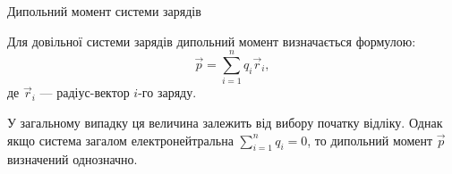\documentclass{beamer}
\begin{document}
\begin{frame}{Дипольний момент системи зарядів}{}
  	\begin{block}{}\justifying
		Для довільної системи зарядів дипольний момент визначається формулою:
		\begin{equation*}
			\vec{p} = \sum_{i=1}^{n}q_i\vec{r}_i,
		\end{equation*}
		де $\vec{r}_i$ --- радіус-вектор $i$-го заряду.

	\end{block}
    \begin{center}
    
    \end{center}
   	\begin{exampleblock}{}\justifying\small
		У загальному випадку ця
		величина залежить від вибору початку відліку. Однак якщо система
		загалом електронейтральна $\sum_{i=1}^{n} q_i = 0$, то
		дипольний момент $\vec{p}$ визначений однозначно.
	\end{exampleblock}
\end{frame}
\end{document}
